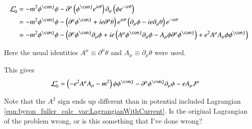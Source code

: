 \begin{align*}
\LL_0' 
&= -m^2 \phi^\conj \phi - 
\partial^\mu \left( \phi^\conj e^{ie\theta} \right) \partial_\mu \left( \phi e^{-ie\theta} \right) \\
&= -m^2 \phi^\conj \phi - 
\left( \partial^\mu \phi^\conj + i e \partial^\mu \theta \right) e^{i e \theta} \left( \partial_\mu \phi - ie \partial_\mu \theta 
\right) 
e^{-ie\theta} 
\\
&= -m^2 \phi^\conj \phi - 
\left( 
\partial^\mu \phi^\conj \partial_\mu \phi 
+ i e \left( A^\mu \phi^\conj \partial_\mu \phi - A_\mu \phi \partial^\mu \phi^\conj \right)
+ e^2 A^\mu A_\mu \phi \phi^\conj
\right) 
\\
\end{align*}

Here the usual identities $A^\mu \equiv \partial^\mu \theta$ and $A_\mu \equiv \partial_\mu \theta$ were used.

This gives
\begin{align}
\LL_0'
&= 
\left( -e^2 A^\mu A_\mu - m^2 \right) \phi \phi^\conj - \partial^\mu \phi^\conj \partial_\mu \phi - e A_\mu J^\mu
\end{align}

Note that the $A^2$ sign ends up different than in potential included Lagrangian \ref{eqn:byron_fuller_calc_var:LagrangianWithCurrent}.  Is the original Lagrangian 
of the problem wrong, or is this something that I've done wrong?

%
%

%
